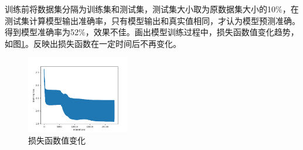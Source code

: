 \documentclass{article}
\begin{document}
\begin{CJK}{UTF8}{gbsn}
训练前将数据集分隔为训练集和测试集，测试集大小取为原数据集大小的10\%，在测试集计算模型输出准确率，只有模型输出和真实值相同，才认为模型预测准确。得到模型准确率为52\%，效果不佳。画出模型训练过程中，损失函数值变化趋势，如图\ref{fig:loss}。反映出损失函数在一定时间后不再变化。

\begin{figure}[htbp] %
    \centering %
    \includegraphics[width=0.4\textwidth]{loss_plot.png}
    \caption{损失函数值变化}
    \label{fig:loss}
\end{figure}

\end{CJK}
\end{document}
